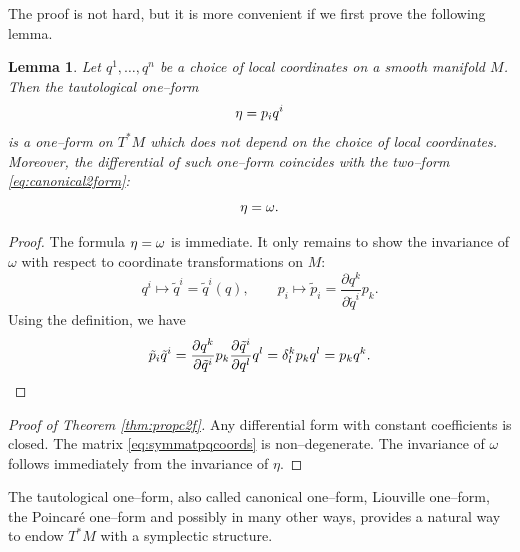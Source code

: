 \documentclass[english,fontsize=11pt,paper=a5,oneside]{scrbook}
\let\d\relax
\DeclareMathOperator{\d}{d}
\newtheorem{lemma}[theorem]{Lemma}
\theoremstyle{definition}
\begin{document}
The proof is not hard, but it is more convenient if we first prove the following lemma.
\begin{lemma}
Let $q^1, \ldots, q^n$ be a choice of local coordinates on a smooth manifold $M$. Then the \emph{tautological one--form}
\begin{equation}
    \eta = p_i \d q^i
\end{equation}
is a one--form on $T^* M$ which does not depend on the choice of local coordinates.
Moreover, the differential of such one--form coincides with the two--form \eqref{eq:canonical2form}:
\begin{equation}
    \d \eta = \omega.
\end{equation}
\end{lemma}

\begin{proof}
    The formula $\d \eta = \omega$ is immediate.
    It only remains to show the invariance of $\omega$ with respect to coordinate transformations on $M$:
    \begin{equation}
        q^i \mapsto \tilde q^i = \tilde q^i(q), \qquad
        p_i \mapsto \tilde p_i = \frac{\partial q^k}{\partial \tilde q^i} p_k.
    \end{equation}
    Using the definition, we have
    \begin{equation}
        \tilde p_i \d \tilde q^i = 
        \frac{\partial q^k}{\partial \tilde q^i} p_k \frac{\partial \tilde q^i}{\partial q^l} \d q^l
        = \delta^k_l p_k \d q^l
        = p_k \d q^k.
    \end{equation}
\end{proof}

\begin{proof}[Proof of Theorem \ref{thm:propc2f}]
    Any differential form with constant coefficients is closed.
    The matrix \eqref{eq:symmatpqcoords} is non--degenerate.
    The invariance of $\omega$ follows immediately from the invariance of $\eta$.
\end{proof}

The tautological one--form, also called canonical one--form, Liouville one--form, the Poincar\'e one--form and possibly in many other ways, provides a natural way to endow $T^*M$ with a symplectic structure.
\end{document}
